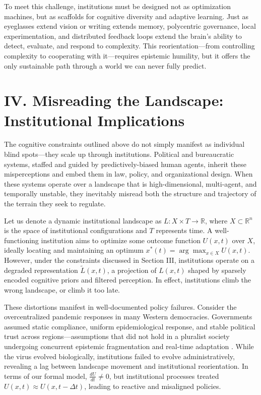 \documentclass[12pt]{article}  %
\begin{document}
To meet this challenge, institutions must be designed not as optimization machines, but as scaffolds for cognitive diversity and adaptive learning. Just as eyeglasses extend vision or writing extends memory, polycentric governance, local experimentation, and distributed feedback loops extend the brain’s ability to detect, evaluate, and respond to complexity. This reorientation—from controlling complexity to cooperating with it—requires epistemic humility, but it offers the only sustainable path through a world we can never fully predict.

\section*{IV. Misreading the Landscape: Institutional Implications}

The cognitive constraints outlined above do not simply manifest as individual blind spots—they scale up through institutions. Political and bureaucratic systems, staffed and guided by predictively-biased human agents, inherit these misperceptions and embed them in law, policy, and organizational design. When these systems operate over a landscape that is high-dimensional, multi-agent, and temporally unstable, they inevitably misread both the structure and trajectory of the terrain they seek to regulate.

Let us denote a dynamic institutional landscape as \( L: X \times T \rightarrow \mathbb{R} \), where \( X \subset \mathbb{R}^n \) is the space of institutional configurations and \( T \) represents time. A well-functioning institution aims to optimize some outcome function \( U(x, t) \) over \( X \), ideally locating and maintaining an optimum \( x^*(t) = \arg\max_{x \in X} U(x, t) \). However, under the constraints discussed in Section III, institutions operate on a degraded representation \( \tilde{L}(x, t) \), a projection of \( L(x, t) \) shaped by sparsely encoded cognitive priors and filtered perception. In effect, institutions climb the wrong landscape, or climb it too late.

These distortions manifest in well-documented policy failures. Consider the overcentralized pandemic responses in many Western democracies. Governments assumed static compliance, uniform epidemiological response, and stable political trust across regions—assumptions that did not hold in a pluralist society undergoing concurrent epistemic fragmentation and real-time adaptation \parencite{kapucu2021managing}. While the virus evolved biologically, institutions failed to evolve administratively, revealing a lag between landscape movement and institutional reorientation. In terms of our formal model, \( \frac{dU}{dt} \neq 0 \), but institutional processes treated \( U(x, t) \approx U(x, t - \Delta t) \), leading to reactive and misaligned policies.
\end{document}
